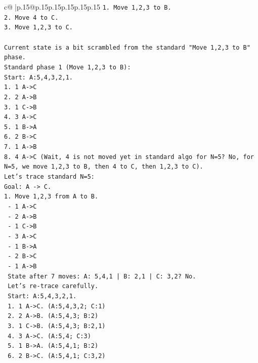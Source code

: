 \documentclass{article}
\begin{document}
{\begin{supertabular}{c@{$\;$}|p{.15\linewidth}@{}p{.15\linewidth}p{.15\linewidth}p{.15\linewidth}p{.15\linewidth}p{.15\linewidth}}
{{{\texttt{1. Move 1,2,3 to B.} \\
\texttt{2. Move 4 to C.} \\
\texttt{3. Move 1,2,3 to C.} \\
\\ 
\texttt{Current state is a bit scrambled from the standard "Move 1,2,3 to B" phase.} \\
\texttt{Standard phase 1 (Move 1,2,3 to B):} \\
\texttt{Start: A:5,4,3,2,1.} \\
\texttt{1. 1 A{-}>C} \\
\texttt{2. 2 A{-}>B} \\
\texttt{3. 1 C{-}>B} \\
\texttt{4. 3 A{-}>C} \\
\texttt{5. 1 B{-}>A} \\
\texttt{6. 2 B{-}>C} \\
\texttt{7. 1 A{-}>B} \\
\texttt{8. 4 A{-}>C (Wait, 4 is not moved yet in standard algo for N=5? No, for N=5, we move 1,2,3 to B, then 4 to C, then 1,2,3 to C).} \\
\texttt{Let's trace standard N=5:} \\
\texttt{Goal: A {-}> C.} \\
\texttt{1. Move 1,2,3 from A to B.} \\
\texttt{   {-} 1 A{-}>C} \\
\texttt{   {-} 2 A{-}>B} \\
\texttt{   {-} 1 C{-}>B} \\
\texttt{   {-} 3 A{-}>C} \\
\texttt{   {-} 1 B{-}>A} \\
\texttt{   {-} 2 B{-}>C} \\
\texttt{   {-} 1 A{-}>B} \\
\texttt{   State after 7 moves: A: 5,4,1 | B: 2,1 | C: 3,2? No.} \\
\texttt{   Let's re{-}trace carefully.} \\
\texttt{   Start: A:5,4,3,2,1.} \\
\texttt{   1. 1 A{-}>C. (A:5,4,3,2; C:1)} \\
\texttt{   2. 2 A{-}>B. (A:5,4,3; B:2)} \\
\texttt{   3. 1 C{-}>B. (A:5,4,3; B:2,1)} \\
\texttt{   4. 3 A{-}>C. (A:5,4; C:3)} \\
\texttt{   5. 1 B{-}>A. (A:5,4,1; B:2)} \\
\texttt{   6. 2 B{-}>C. (A:5,4,1; C:3,2)} \\
}}}
\end{supertabular}}
\end{document}
